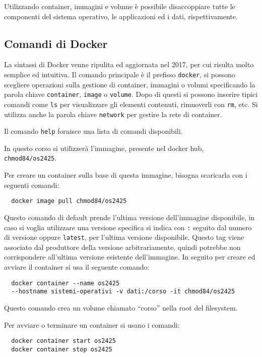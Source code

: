 \documentclass{article}
\numberwithin{equation}{subsection}
\begin{document}
Utilizzando container, immagini e volume è possibile disaccoppiare tutte le componenti del sistema operativo, le applicazioni ed i dati, rispettivamente. 

\subsection{Comandi di Docker}

La sintassi di Docker venne ripulita ed aggiornata nel 2017, per cui risulta molto semplice ed intuitiva. Il comando principale è il prefisso \verb|docker|, si possono scegliere operazioni sulla gestione di container, 
immagini o volumi specificando la parola chiave \verb|container|, \verb|image| o \verb|volume|. Dopo di questi si possono inserire tipici comandi come \verb|ls| per visualizzare gli elementi contenuti, rimuoverli con 
\verb|rm|, etc. Si utilizza anche la parola chiave \verb|network| per gestire la rete di container. 

Il comando \verb|help| fornisce una lista di comandi disponibili. 

In questo corso si utilizzerà l'immagine, presente nel docker hub, \verb|chmod84/os2425|. 


Per creare un container sulla base di questa immagine, bisogna scaricarla con i seguenti comandi:
\begin{verbatim}
  docker image pull chmod84/os2425
\end{verbatim}
Questo comando di default prende l'ultima versione dell'immagine disponibile, in caso si voglia utilizzare una versione specifica si indica con \verb|:| seguito dal numero di versione oppure \verb|latest|, per l'ultima 
versione disponibile. Questo tag viene associato dal produttore della versione arbitrariamente, quindi potrebbe non corrispondere all'ultima versione esistente dell'immagine. 
In seguito per creare ed avviare il container si usa il seguente comando:
\begin{verbatim}
  docker container --name os2425
  --hostname sistemi-operativi -v dati:/corso -it chmod84/os2425
\end{verbatim}
Questo comando crea un volume chiamato ``corso'' nella root del filesystem. 

Per avviare o terminare un container si usano i comandi:
\begin{verbatim}
  docker container start os2425
  docker container stop os2425
\end{verbatim}
\end{document}
